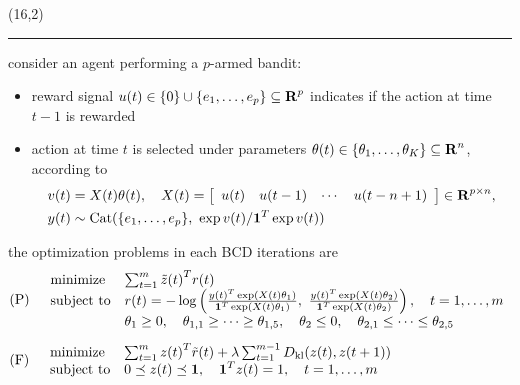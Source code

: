 \documentclass[a0]{a0poster}
\begin{document}
\begin{textblock}{7}(16,2)
\hrule\vspace*{0.5\baselineskip}
consider an agent performing a $p$-armed bandit:
\begin{itemize}
    \item reward signal $u(t) \in \{0\} \cup \{e_1, \ldots, e_p\} \subseteq {\bf R{}}^p$ indicates if the action at time $t - 1$ is rewarded
    \item action at time $t$ is selected under parameters $\theta(t) \in \{\theta_1, \ldots, \theta_K\} \subseteq {\bf R{}}^n$, according to
        \[
            \begin{aligned}
                &v(t) = X(t) \theta(t),\quad
                X(t) = \left[
                    \begin{array}{cccc}
                        u(t) & u(t - 1) & \cdots & u(t - n + 1)
                    \end{array}
                \right] \in {\bf R{}}^{p \times n},\\
                &y(t) \sim {\rm Cat}(\{e_1, \ldots, e_p\},\ \exp v(t) / {\bf 1{}}^T \exp v(t))
            \end{aligned}
        \]
\end{itemize}
the optimization problems in each BCD iterations are
\[
    \begin{aligned}
        &\mbox{(P)}\quad
        \begin{array}{ll}
            \mbox{minimize} & \sum_{t = 1}^{m} {\tilde{z}(t)}^T r(t)\\
            \mbox{subject to} & r(t) = -\log \left(\frac{{y(t)}^T \exp(X(t)\theta_1)}{{\bf 1{}}^T \exp(X(t)\theta_1)},\ \frac{{y(t)}^T \exp(X(t)\theta_2)}{{\bf 1{}}^T \exp(X(t)\theta_2)}\right),\quad t = 1, \ldots, m\\
            & \theta_1 \geq 0,\quad \theta_{1, 1} \geq \cdots \geq \theta_{1, 5},\quad \theta_2 \leq 0,\quad \theta_{2, 1} \leq \cdots \leq \theta_{2, 5}
        \end{array}\\[5pt]
        &\mbox{(F)}\quad
        \begin{array}{ll}
            \mbox{minimize} & \sum_{t = 1}^{m} {z(t)}^T \tilde{r}(t) + \lambda \sum_{t = 1}^{m - 1} \mathop{D_{\rm kl}}(z(t), z(t + 1))\\
            \mbox{subject to} & 0 \preceq z(t) \preceq {\bf 1{}},\quad {\bf 1{}}^T z(t) = 1,\quad t = 1, \ldots, m
        \end{array}
    \end{aligned}
\]
\end{textblock}
\end{document}
